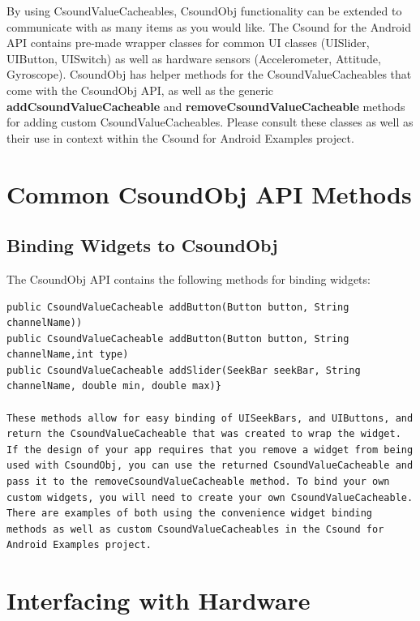 \documentclass[11pt]{article}
\begin{document}
By using CsoundValueCacheables, CsoundObj functionality can be extended to communicate with as many items as you would like. The Csound for the Android API contains pre-made wrapper classes for common UI classes (UISlider, UIButton, UISwitch) as well as hardware sensors (Accelerometer, Attitude, Gyroscope).  CsoundObj has helper methods for the CsoundValueCacheables that come with the CsoundObj API, as well as the generic \textbf{addCsoundValueCacheable} and \textbf{removeCsoundValueCacheable} methods for adding custom CsoundValueCacheables. Please consult these classes as well as their use in context within the Csound for Android Examples project.



\section{Common CsoundObj API Methods}

\subsection{Binding Widgets to CsoundObj}

The CsoundObj API contains the following methods for binding widgets:

\begin{lstlisting}[caption=Methods for Widget Binding]
public CsoundValueCacheable addButton(Button button, String channelName))
public CsoundValueCacheable addButton(Button button, String channelName,int type)
public CsoundValueCacheable addSlider(SeekBar seekBar, String channelName, double min, double max)}

These methods allow for easy binding of UISeekBars, and UIButtons, and return the CsoundValueCacheable that was created to wrap the widget. If the design of your app requires that you remove a widget from being used with CsoundObj, you can use the returned CsoundValueCacheable and pass it to the removeCsoundValueCacheable method. To bind your own custom widgets, you will need to create your own CsoundValueCacheable.  There are examples of both using the convenience widget binding methods as well as custom CsoundValueCacheables in the Csound for Android Examples project.
\end{lstlisting}

\section{Interfacing with Hardware}
\end{document}
